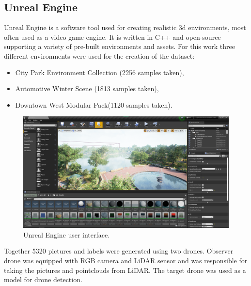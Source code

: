 \documentclass[twoside]{ctuthesis}
\theoremstyle{plain}
\theoremstyle{definition}
\theoremstyle{note}
\begin{document}
\subsection{Unreal Engine}
Unreal Engine is a software tool used for creating realistic 3d environments, most often used as a video game engine. It is written in C++ and open-source supporting a variety of pre-built environments and assets. For this work three different environments were used for the creation of the dataset:
\begin{itemize}
	\item City Park Environment Collection (2256 samples taken),
	\item Automotive Winter Scene (1813 samples taken),
	\item Downtown West Modular Pack(1120 samples taken).
\end{itemize}
\begin{figure}[h]
	\centering
	\includegraphics[width=\textwidth]{unreal_ui.png}
	\caption{Unreal Engine user interface.}
\end{figure}
Together 5320 pictures and labels were generated using two drones. Observer drone was equipped with RGB camera and LiDAR sensor and was responsible for taking the pictures and pointclouds from LiDAR. The target drone was used as a model for drone detection.
\end{document}
